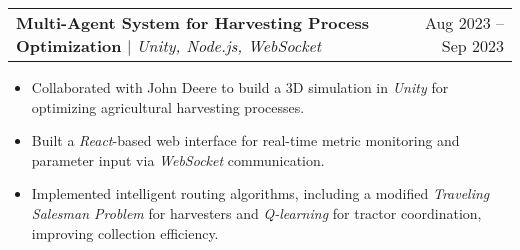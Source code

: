 \documentclass[letterpaper,11pt]{article}
\makeatletter
\newcommand{\resumeItem}[1]{
    \item\small{
            {#1 \vspace{-2pt}}
    }
}
\newcommand{\resumeProjectHeading}[2]{
    \item
    \begin{tabular*}{0.97\textwidth}{l@{\extracolsep{\fill}}r}
        \small#1 & #2 \\
    \end{tabular*}\vspace{-7pt}
}
\newcommand{\resumeItemListStart}{\begin{itemize}}
\newcommand{\resumeItemListEnd}{\end{itemize}\vspace{-5pt}}
\makeatother
\begin{document}




\resumeProjectHeading
{\textbf{Multi-Agent System for Harvesting Process Optimization} $|$ \emph{Unity, Node.js, WebSocket}}{Aug 2023 -- Sep 2023}
\resumeItemListStart
\resumeItem{Collaborated with John Deere to build a 3D simulation in \textit{Unity} for optimizing agricultural harvesting processes.}
\resumeItem{Built a \textit{React}-based web interface for real-time metric monitoring and parameter input via \textit{WebSocket} communication.}
\resumeItem{Implemented intelligent routing algorithms, including a modified \textit{Traveling Salesman Problem} for harvesters and \textit{Q-learning} for tractor coordination, improving collection efficiency.}
\resumeItemListEnd

\end{document}
